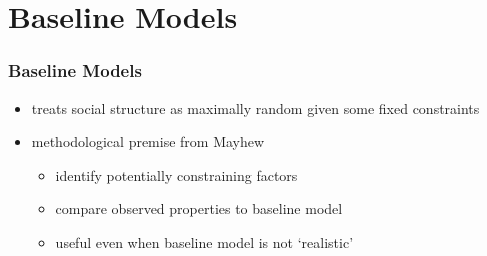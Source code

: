 \documentclass{beamer}
\begin{document}
\section{Baseline Models}
\begin{frame}
\frametitle{Baseline Models}
\begin{itemize}
\pause
\item treats social structure as maximally random given some fixed constraints
\pause
\item methodological premise from Mayhew
\begin{itemize}
\pause
\item identify potentially constraining factors
\pause
\item compare observed properties to baseline model
\pause
\item useful even when baseline model is not `realistic'
\end{itemize}
\end{itemize}
\end{frame}
\end{document}
